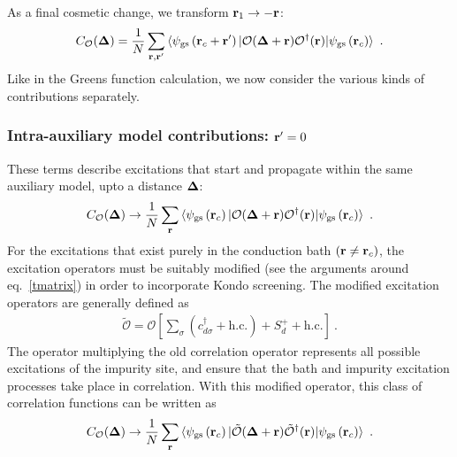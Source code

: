 \documentclass[reprint,hidelinks,onecolumn]{revtex4-2}
\begin{document}
As a final cosmetic change, we transform \({\bf r}_1 \to -{\bf r}\):
\begin{equation}\begin{aligned}
	C_{\mathcal{O}}({\bf \Delta}) = \frac{1}{N}\sum_{{\bf r},{\bf r}^\prime}\braket{\psi_\text{gs}\left({\bf r}_c + {\bf r}^\prime\right) | \mathcal{O}({\bf \Delta} + {\bf r}) \mathcal{O}^\dagger({\bf r}) | \psi_\text{gs}\left({\bf r}_c\right)}~.
\end{aligned}\end{equation}
Like in the Greens function calculation, we now consider the various kinds of contributions separately.

\subsubsection{Intra-auxiliary model contributions: \({\bf r}^\prime = 0\)}
These terms describe excitations that start and propagate within the same auxiliary model, upto a distance \({\bf \Delta}\):
\begin{equation}\begin{aligned}
	C_{\mathcal{O}}({\bf \Delta}) \to \frac{1}{N}\sum_{{\bf r}}\braket{\psi_\text{gs}\left({\bf r}_c\right) | \mathcal{O}({\bf \Delta} + {\bf r})\mathcal{O}^\dagger({\bf r}) | \psi_\text{gs}\left({\bf r}_c\right)}~.
\end{aligned}\end{equation}
For the excitations that exist purely in the conduction bath \(({\bf r} \neq {\bf r}_c)\), the excitation operators must be suitably modified (see the arguments around eq.~\ref{tmatrix}) in order to incorporate Kondo screening. The modified excitation operators are generally defined as
\begin{equation}\begin{aligned}\label{operatorTmatrix}
\mathcal{\tilde O} = \mathcal{O} \left[\sum_{\sigma}\left(c^\dagger_{d\sigma} + \text{h.c.}\right) + S_d^+ + \text{h.c.}\right] ~.
\end{aligned}\end{equation}
The operator multiplying the old correlation operator represents all possible excitations of the impurity site, and ensure that the bath and impurity excitation processes take place in correlation. With this modified operator, this class of correlation functions can be written as
\begin{equation}\begin{aligned}
	C_{\mathcal{O}}({\bf \Delta}) \to \frac{1}{N}\sum_{{\bf r} }\braket{\psi_\text{gs}\left({\bf r}_c\right) | \mathcal{\tilde O}({\bf \Delta} + {\bf r})\mathcal{\tilde O}^\dagger({\bf r}) | \psi_\text{gs}\left({\bf r}_c\right)}~.
\end{aligned}\end{equation}
\end{document}
